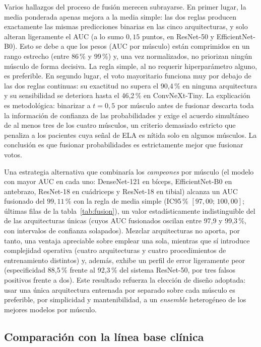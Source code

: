 \documentclass[12pt]{extarticle}
\numberwithin{equation}{section}
\begin{document}
\begin{refsection}
Varios hallazgos del proceso de fusión merecen subrayarse. En primer lugar, la media ponderada apenas mejora a la media simple: las dos reglas producen exactamente las mismas predicciones binarias en las cinco arquitecturas, y solo alteran ligeramente el AUC (a lo sumo $0{,}15$ puntos, en ResNet-50 y EfficientNet-B0). Esto se debe a que los pesos (AUC por músculo) están comprimidos en un rango estrecho (entre 86\,\% y 99\,\%) y, una vez normalizados, no priorizan ningún músculo de forma decisiva. La regla simple, al no requerir hiperparámetro alguno, es preferible. En segundo lugar, el voto mayoritario funciona muy por debajo de las dos reglas continuas: su exactitud no supera el 90{,}4\,\% en ninguna arquitectura y su sensibilidad se deteriora hasta el 46{,}2\,\% en ConvNeXt-Tiny. La explicación es metodológica: binarizar a $t=0{,}5$ por músculo antes de fusionar descarta toda la información de confianza de las probabilidades y exige el acuerdo simultáneo de al menos tres de los cuatro músculos, un criterio demasiado estricto que penaliza a los pacientes cuya señal de ELA es nítida solo en algunos músculos. La conclusión es que fusionar probabilidades es estrictamente mejor que fusionar votos.

Una estrategia alternativa que combinaría los \textit{campeones} por músculo (el modelo con mayor AUC en cada uno: DenseNet-121 en bíceps, EfficientNet-B0 en antebrazo, ResNet-18 en cuádriceps y ResNet-18 en tibial) alcanza un AUC fusionado del $99{,}11$\,\% con la regla de media simple (IC95\,\% $[97{,}00;\,100{,}00]$; últimas filas de la tabla~\ref{tab:fusion}), un valor estadísticamente indistinguible del de las arquitecturas únicas (cuyos AUC fusionados oscilan entre 97{,}9 y 99{,}3\,\%, con intervalos de confianza solapados). Mezclar arquitecturas no aporta, por tanto, una ventaja apreciable sobre emplear una sola, mientras que sí introduce complejidad operativa (cuatro arquitecturas y cuatro procedimientos de entrenamiento distintos) y, además, exhibe un perfil de error ligeramente peor (especificidad 88{,}5\,\% frente al 92{,}3\,\% del sistema ResNet-50, por tres falsos positivos frente a dos). Este resultado refuerza la elección de diseño adoptada: usar una única arquitectura entrenada por separado sobre cada músculo es preferible, por simplicidad y mantenibilidad, a un \textit{ensemble} heterogéneo de los mejores modelos por músculo.

\subsection{Comparación con la línea base clínica}\label{subsec:resultados-baseline}


\end{refsection}
\end{document}
